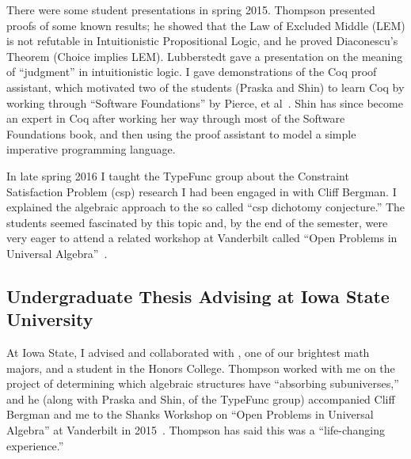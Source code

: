 
There were some student presentations in spring 2015. Thompson presented proofs of some known results; he showed that the Law of Excluded Middle (LEM) is not refutable in Intuitionistic Propositional Logic, and he proved Diaconescu's Theorem (Choice implies LEM). Lubberstedt gave a presentation on the meaning of ``judgment'' in intuitionistic logic. I gave demonstrations of the Coq proof assistant, which motivated two of the students (Praska and Shin) to learn Coq by working through ``Software Foundations'' by Pierce, et al~\cite{Pierce:SF}. Shin has since become an expert in Coq after working her way through most of the Software Foundations book, and then using the proof assistant to model a simple imperative programming language.


In late spring 2016 I taught the TypeFunc group about the Constraint Satisfaction Problem (csp) research I had been engaged in with Cliff Bergman. I explained the algebraic approach to the so called ``csp dichotomy conjecture.'' The students seemed fascinated by this topic and, by the end of the semester, were very eager to attend a related workshop at Vanderbilt called ``Open Problems in Universal Algebra''~\cite{Shanks}.



\subsection{Undergraduate Thesis Advising at Iowa State University}
At Iowa State, I advised and collaborated with , one of our brightest math majors, and a student in the Honors College. Thompson worked with me on the project of determining which algebraic structures have ``absorbing subuniverses,'' and he (along with Praska and Shin, of the TypeFunc group) accompanied Cliff Bergman and me to the Shanks Workshop on ``Open Problems in Universal Algebra'' at Vanderbilt in 2015~\cite{Shanks}.  Thompson has said this was a ``life-changing experience.''

